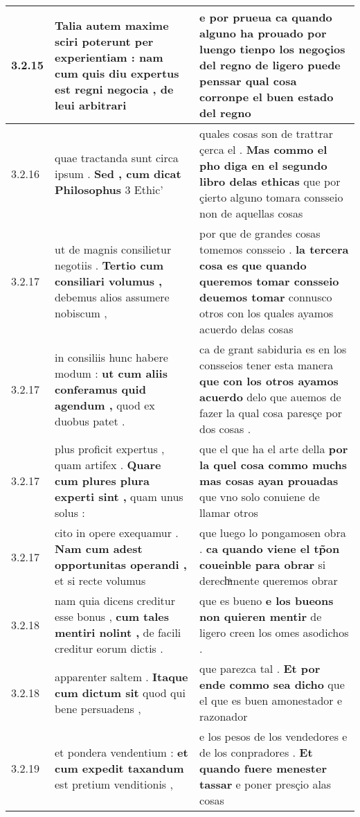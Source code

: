 \begin{tabular}{|p{1cm}|p{6.5cm}|p{6.5cm}|}
3.2.15 & Talia autem maxime sciri poterunt per experientiam : \textbf{ nam cum quis diu expertus est regni negocia , } de leui arbitrari & e por prueua \textbf{ ca quando alguno ha prouado por luengo tienpo los negoçios del regno de ligero puede penssar qual cosa } corronpe el buen estado del regno \\\hline
3.2.16 & quae tractanda sunt circa ipsum . \textbf{ Sed , cum dicat Philosophus } 3 Ethic’ & quales cosas son de trattrar çerca el . \textbf{ Mas commo el pho diga en el segundo libro delas ethicas } que por çierto alguno tomara consseio non de aquellas cosas \\\hline
3.2.17 & ut de magnis consilietur negotiis . \textbf{ Tertio cum consiliari volumus , } debemus alios assumere nobiscum , & por que de grandes cosas tomemos consseio . \textbf{ la tercera cosa es que quando queremos tomar consseio deuemos tomar } connusco otros con los quales ayamos acuerdo delas cosas \\\hline
3.2.17 & in consiliis hunc habere modum : \textbf{ ut cum aliis conferamus quid agendum , } quod ex duobus patet . & ca de grant sabiduria es en los consseios tener esta manera \textbf{ que con los otros ayamos acuerdo } delo que auemos de fazer la qual cosa paresçe por dos cosas . \\\hline
3.2.17 & plus proficit expertus , quam artifex . \textbf{ Quare cum plures plura experti sint , } quam unus solus : & que el que ha el arte della \textbf{ por la quel cosa commo muchs mas cosas ayan prouadas } que vno solo conuiene de llamar otros \\\hline
3.2.17 & cito in opere exequamur . \textbf{ Nam cum adest opportunitas operandi , } et si recte volumus & que luego lo pongamosen obra . \textbf{ ca quando viene el tp̃on coueinble para obrar } si derechͣmente queremos obrar \\\hline
3.2.18 & nam quia dicens creditur esse bonus , \textbf{ cum tales mentiri nolint , } de facili creditur eorum dictis . & que es bueno \textbf{ e los bueons non quieren mentir } de ligero creen los omes asodichos . \\\hline
3.2.18 & apparenter saltem . \textbf{ Itaque cum dictum sit } quod qui bene persuadens , & que parezca tal . \textbf{ Et por ende commo sea dicho } que el que es buen amonestador e razonador \\\hline
3.2.19 & et pondera vendentium : \textbf{ et cum expedit taxandum } est pretium venditionis , & e los pesos de los vendedores e de los conpradores . \textbf{ Et quando fuere menester tassar } e poner presçio alas cosas \\\hline

\end{tabular}
